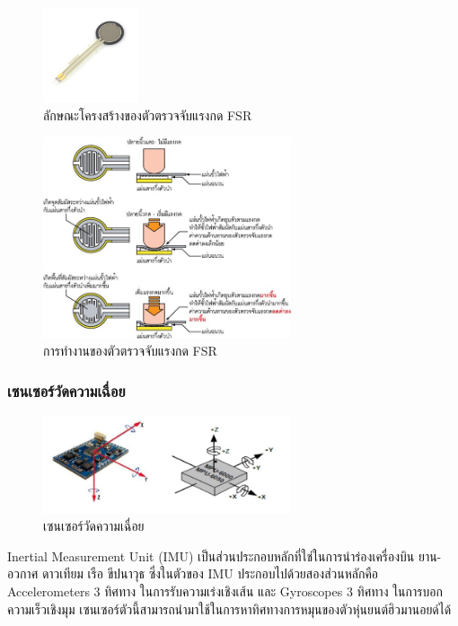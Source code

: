 \begin{figure}[htbp]
    \centering
    \includegraphics[width=0.25\textwidth]{chapter2/images/FSRx.jpg}
    \caption{ลักษณะโครงสร้างของตัวตรวจจับแรงกด FSR}
    \label{fig:fsr_sensor}
\end{figure}

\begin{figure}[htbp]
    \centering
    \includegraphics[width=0.65\textwidth]{chapter2/images/FSR.jpg}
    \caption{การทำงานของตัวตรวจจับแรงกด FSR}
    \label{fig:fsr_sensor_2}
\end{figure}

\subsubsection{เซนเซอร์วัดความเฉื่อย}

\begin{figure}[htbp]
    \centering
    \includegraphics[width=0.65\textwidth]{chapter2/images/imu.png}
    \caption{เซนเซอร์วัดความเฉื่อย}
    \label{fig:imu_sensor}
\end{figure}

Inertial Measurement Unit (IMU) เป็นส่วนประกอบหลักที่ใช่ในการนำร่องเครื่องบิน ยาน-อวกาศ ดาวเทียม เรือ
ขีปนาวุธ ซึ่งในตัวของ IMU ประกอบไปด้วยสองส่วนหลักคือ Accelerometers 3 ทิศทาง ในการรับความเร่งเชิงเส้น
และ Gyroscopes 3 ทิศทาง ในการบอกความเร็วเชิงมุม เซนเซอร์ตัวนี้สามารถนำมาใช้ในการหาทิศทางการหมุนของตัวหุ่นยนต์ฮิวมานอยด์ได้

